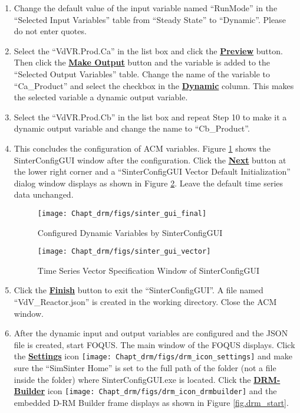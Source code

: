 \begin{enumerate}
	\item Change the default value of the input variable named ``RunMode'' in the ``Selected Input Variables'' table from ``Steady State'' to ``Dynamic''.  Please do not enter quotes.
	\item Select the ``VdVR.Prod.Ca'' in the list box and click the \textbf{\underline{Preview}} button.  Then click the \textbf{\underline{Make Output}} button and the variable is added to the ``Selected Output Variables'' table.  Change the name of the variable to ``Ca\_Product'' and select the checkbox in the \textbf{\underline{Dynamic}} column.  This makes the selected variable a dynamic output variable.
	\item Select the ``VdVR.Prod.Cb'' in the list box and repeat Step 10 to make it a dynamic output variable and change the name to ``Cb\_Product''.
	\item This concludes the configuration of ACM variables.  Figure \ref{fig.sinter_gui_final} shows the SinterConfigGUI window after the configuration.  Click the \textbf{\underline{Next}} button at the lower right corner and a ``SinterConfigGUI Vector Default Initialization'' dialog window displays as shown in Figure \ref{fig.sinter_gui_vector}.  Leave the default time series data unchanged. 
	\begin{figure}[H]
		\begin{center}
			\texttt{[image: Chapt\_drm/figs/sinter\_gui\_final]}
			\caption{Configured Dynamic Variables by SinterConfigGUI}
			\label{fig.sinter_gui_final}
		\end{center}
	\end{figure}
	\begin{figure}[H]
		\begin{center}
			\texttt{[image: Chapt\_drm/figs/sinter\_gui\_vector]}
			\caption{Time Series Vector Specification Window of SinterConfigGUI}
			\label{fig.sinter_gui_vector}
		\end{center}
	\end{figure}
	\item Click the \textbf{\underline{Finish}} button to exit the ``SinterConfigGUI''.  A file named ``VdV\_Reactor.json'' is created in the working directory.  Close the ACM window.
	\item After the dynamic input and output variables are configured and the JSON file is created, start FOQUS.  The main window of the FOQUS displays.  Click the \textbf{\underline{Settings}} icon \texttt{[image: Chapt\_drm/figs/drm\_icon\_settings]} and make sure the ``SimSinter Home'' is set to the full path of the folder (not a file inside the folder) where SinterConfigGUI.exe is located.  Click the \textbf{\underline{DRM-Builder}} icon \texttt{[image: Chapt\_drm/figs/drm\_icon\_drmbuilder]} and the embedded D-RM Builder frame displays as shown in Figure \ref{fig.drm_start}.

\end{enumerate}
